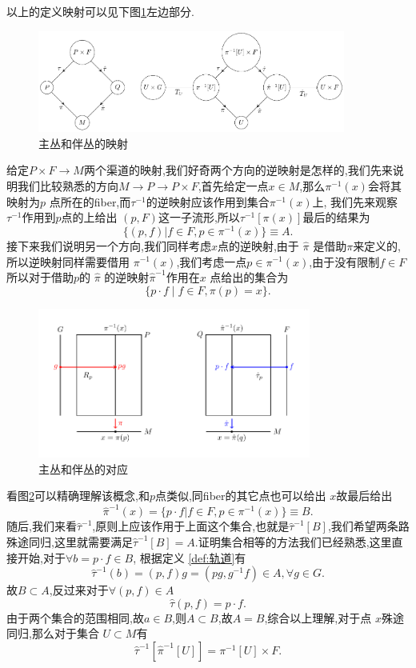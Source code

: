 \documentclass[../main.tex]{subfiles}
\begin{document}
以上的定义映射可以见下图\ref{fig:I-3-1}左边部分.
\begin{figure}[htpb]
  \centering
  \includegraphics[width=0.9\textwidth]{../tikzpicture/I31.pdf}
  \caption{主丛和伴丛的映射}
  \label{fig:I-3-1}
\end{figure}

给定$P\times F \to M$两个渠道的映射,我们好奇两个方向的逆映射是怎样的,我们先来说明我们比较熟悉的方向$M\to P\to P\times F$,首先给定一点$x \in M$,那么$\pi^{-1}(x)$会将其映射为$p$ 点所在的fiber,而$\tau^{-1}$的逆映射应该作用到集合$\pi^{-1}(x)$上,
我们先来观察$\tau^{-1}$作用到$p$点的上给出 $(p,F)$这一子流形,所以$\tau^{-1}[\pi(x)]$最后的结果为\[
  \{(p, f)| f\in F, p \in \pi^{-1}(x)\} \equiv A
.\]
接下来我们说明另一个方向,我们同样考虑$x$点的逆映射,由于 $\hat{\pi}$ 是借助$\pi$来定义的,所以逆映射同样需要借用 $\pi^{-1}(x)$,我们考虑一点$p \in \pi^{-1}(x)$,由于没有限制$f \in F$所以对于借助$p$的 $\hat{\pi}$ 的逆映射$\hat{\pi}^{-1}$作用在$x$
点给出的集合为 \[
  \{p\cdot f \mid f \in F,\pi(p) = x\}
.\] 

\begin{figure}[htpb]
  \centering
  \includegraphics[width=0.8\textwidth]{../tikzpicture/I32.pdf}
  \caption{主丛和伴丛的对应}
  \label{fig:I-3-2}
\end{figure}
看图\ref{fig:I-3-2}可以精确理解该概念,和$p$点类似,同fiber的其它点也可以给出 $x$故最后给出 \[
  \hat{\pi}^{-1}(x) = \{ p \cdot f | f\in F,p \in \pi^{-1}(x)\} \equiv B
.\] 
随后,我们来看$\hat{\tau}^{-1}$,原则上应该作用于上面这个集合,也就是$\hat{\tau}^{-1}[B]$,我们希望两条路殊途同归,这里就需要满足$\hat{\tau}^{-1}[B] = A$.证明集合相等的方法我们已经熟悉,这里直接开始,对于$\forall b = p \cdot f \in B$,
根据定义 \ref{def:轨道}有 \[
\hat{\tau}^{-1}(b) = (p,f)g = (pg,g^{-1}f) \in  A,  \forall g\in G 
.\] 
故$B \subset A$,反过来对于$ \forall (p,f) \in A$\[
\hat{\tau}(p,f) = p \cdot f 
.\] 
由于两个集合的范围相同,故$a \in B$,则$A \subset  B$,故$A = B$,综合以上理解,对于点 $x$殊途同归,那么对于集合 $U \subset M$有\[
  \hat{\tau}^{-1}[\hat{\pi}^{-1}[U]] = \pi^{-1}[U] \times F
.\] 
\end{document}
